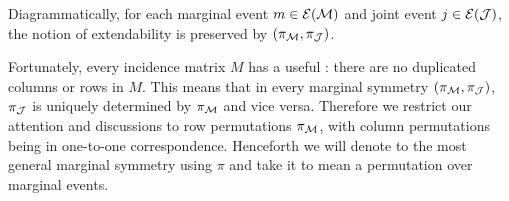 \documentclass[aps, 10pt, english, twoside, pra, nofootinbib, longbibliography]{revtex4-1}
\begin{document}

    Diagrammatically, for each marginal event $m \in \Events{\mscenario}$ and joint event $j \in \Events{\jointvar}$, the notion of extendability is preserved by $\br{\pi_\mscenario, \pi_\jointvar}$.
    \begin{center}
    \end{center}
    Fortunately, every incidence matrix $M$ has a useful : there are no duplicated columns or rows in $M$. This means that in every marginal symmetry $\br{\pi_\mscenario, \pi_\jointvar}$, $\pi_{\mathcal{J}}$ is uniquely determined by $\pi_{\mathcal{M}}$ and vice versa. Therefore we restrict our attention and discussions to row permutations $\pi_{\mathcal{M}}$, with column permutations being in one-to-one correspondence. Henceforth we will denote to the most general marginal symmetry using $\pi$ and take it to mean a permutation over marginal events. \\
\end{document}
